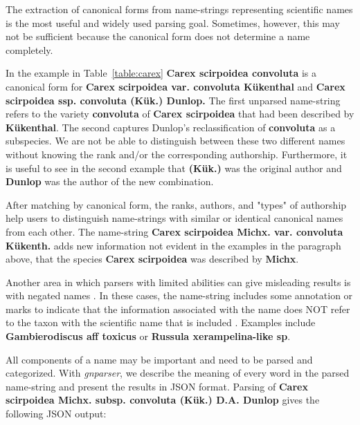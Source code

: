 \documentclass{bmcart}
\begin{document}
The extraction of canonical forms from name-strings representing scientific
names is the most useful and widely used parsing goal. Sometimes, however, this may not be sufficient because the canonical form does not
determine a name completely.

In the example in Table~\ref{table:carex} \textbf{Carex scirpoidea convoluta}
is a canonical form for \textbf{Carex scirpoidea var. convoluta Kükenthal} and
\textbf{Carex scirpoidea ssp. convoluta (Kük.) Dunlop.} The first unparsed name-string refers to the variety \textbf{convoluta} of \textbf{Carex
scirpoidea} that had been described by \textbf{Kükenthal}. The second captures
Dunlop's reclassification of \textbf{convoluta} as a subspecies. We are not be able to distinguish between these
two different names without knowing the rank and/or the corresponding authorship.
Furthermore, it is useful to see in the second example that \textbf{(Kük.)} was the
original author and \textbf{Dunlop} was the author of the new combination.

After matching by canonical form, the ranks, authors, and "types" of authorship
help users to distinguish name-strings with similar or identical canonical names from each other.
The name-string \textbf{Carex scirpoidea Michx. var. convoluta Kükenth.} adds
new information not evident in the examples in the paragraph above, that the
species \textbf{Carex scirpoidea} was described by \textbf{Michx}.

Another area in which parsers with limited abilities can give misleading results is with
negated names \cite{Patterson:inpress-a}. In these cases, the name-string
includes some annotation or marks to indicate that the information associated with the name does NOT refer to the taxon with the scientific name that is included . Examples include \textbf{Gambierodiscus aff
toxicus} or \textbf{Russula xerampelina-like sp}.

All components of a name may be important and need to be parsed and
categorized. With \textit{gnparser}, we describe the meaning of every word in
the parsed name-string and present the results in JSON format. Parsing of \textbf{Carex
scirpoidea Michx.  subsp. convoluta (Kük.) D.A. Dunlop} gives the following
JSON output:

\vspace{0.5cm}
\end{document}
